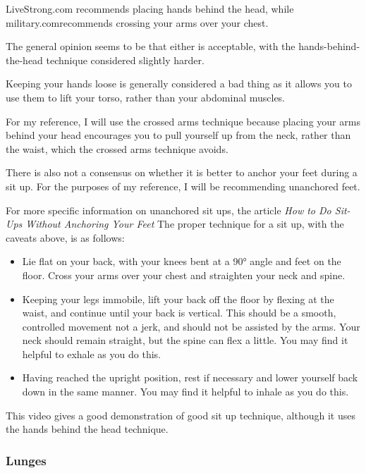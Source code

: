 \documentclass[a4paper]{article}
\begin{document}
LiveStrong.com\cite{bgref19} recommends placing hands behind the head, while military.com\cite{bgref20}recommends crossing your arms over your chest. 

The general opinion seems to be that either is acceptable, with the hands-behind-the-head technique considered slightly harder\cite{bgref21}.

Keeping your hands loose is generally considered a bad thing as it allows you to use them to lift your torso, rather than your abdominal muscles. 

For my reference, I will use the crossed arms technique because placing your arms behind your head encourages you to pull yourself up from the neck, rather than the waist, which the crossed arms technique avoids.

There is also not a consensus on whether it is better to anchor your feet during a sit up. For the purposes of my reference, I will be recommending unanchored feet. 

For more specific information on unanchored sit ups, the article \textit{How to Do Sit-Ups Without Anchoring Your Feet}\cite{bgref22}
The proper technique for a sit up, with the caveats above, is as follows:

\begin{itemize}
    \item Lie flat on your back, with your knees bent at a 90° angle and feet on the floor. Cross your arms over your chest and straighten your neck and spine.
    \item Keeping your legs immobile, lift your back off the floor by flexing at the waist, and continue until your back is vertical. This should be a smooth, controlled movement not a jerk, and should not be assisted by the arms. Your neck should remain straight, but the spine can flex a little. You may find it helpful to exhale as you do this.
    \item Having reached the upright position, rest if necessary and lower yourself back down in the same manner. You may find it helpful to inhale as you do this.
\end{itemize}

This video\cite{bgref23} gives a good demonstration of good sit up technique, although it uses the hands behind the head technique.

\subsubsection{Lunges}
\end{document}
